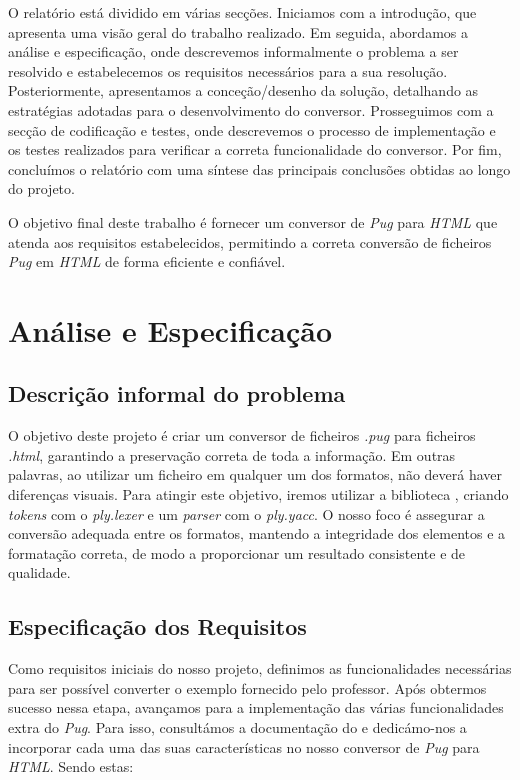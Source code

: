 \documentclass[11pt,a4paper]{report}%
\begin{document}
O relatório está dividido em várias secções. Iniciamos com a introdução, que apresenta uma visão geral do trabalho realizado. Em seguida, abordamos a análise e especificação, onde descrevemos informalmente o problema a ser resolvido e estabelecemos os requisitos necessários para a sua resolução. Posteriormente, apresentamos a conceção/desenho da solução, detalhando as estratégias adotadas para o desenvolvimento do conversor. Prosseguimos com a secção de codificação e testes, onde descrevemos o processo de implementação e os testes realizados para verificar a correta funcionalidade do conversor. Por fim, concluímos o relatório com uma síntese das principais conclusões obtidas ao longo do projeto.

O objetivo final deste trabalho é fornecer um conversor de \textit{Pug} para \textit{HTML} que atenda aos requisitos estabelecidos, permitindo a correta conversão de ficheiros \textit{Pug} em \textit{HTML} de forma eficiente e confiável.
\newpage


\chapter{Análise e Especificação} \label{chap:analiseEspecificacao} %
\section{Descrição informal do problema} \label{sec:descricaoProblema} %
O objetivo deste projeto é criar um conversor de ficheiros \textit{.pug} para ficheiros \textit{.html}, garantindo a preservação correta de toda a informação. Em outras palavras, ao utilizar um ficheiro em qualquer um dos formatos, não deverá haver diferenças visuais. Para atingir este objetivo, iremos utilizar a biblioteca \cite{PLY}, criando \textit{tokens} com o \textit{ply.lexer} e um \textit{parser} com o \textit{ply.yacc}. O nosso foco é assegurar a conversão adequada entre os formatos, mantendo a integridade dos elementos e a formatação correta, de modo a proporcionar um resultado consistente e de qualidade.


\section{Especificação dos Requisitos}
Como requisitos iniciais do nosso projeto, definimos as funcionalidades necessárias para ser possível converter o exemplo fornecido pelo professor. Após obtermos sucesso nessa etapa, avançamos para a implementação das várias funcionalidades extra do \textit{Pug}. Para isso, consultámos a documentação do \cite{Pug} e dedicámo-nos a incorporar cada uma das suas características no nosso conversor de \textit{Pug} para \textit{HTML}. Sendo estas:
\end{document}
